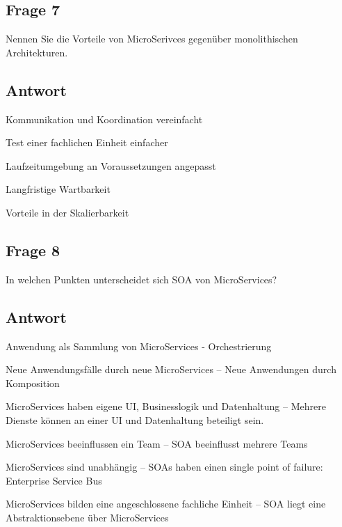 \subsection*{Frage 7}
Nennen Sie die Vorteile von MicroSerivces gegenüber monolithischen Architekturen.
\subsection*{Antwort}
\item Kommunikation und Koordination vereinfacht
\item Test einer fachlichen Einheit einfacher
\item Laufzeitumgebung an Voraussetzungen angepasst
\item Langfristige Wartbarkeit
\item Vorteile in der Skalierbarkeit
\subsection*{Frage 8}
In welchen Punkten unterscheidet sich SOA von MicroServices?
\subsection*{Antwort}
\item Anwendung als Sammlung von MicroServices - Orchestrierung
\item Neue Anwendungsfälle durch neue MicroServices – Neue Anwendungen durch Komposition
\item MicroServices haben eigene UI, Businesslogik und Datenhaltung – Mehrere Dienste können an einer UI und Datenhaltung beteiligt sein.
\item MicroServices beeinflussen ein Team – SOA beeinflusst mehrere Teams
\item MicroServices sind unabhängig – SOAs haben einen single point of failure: Enterprise Service Bus
\item MicroServices bilden eine angeschlossene fachliche Einheit – SOA liegt eine Abstraktionsebene über MicroServices
